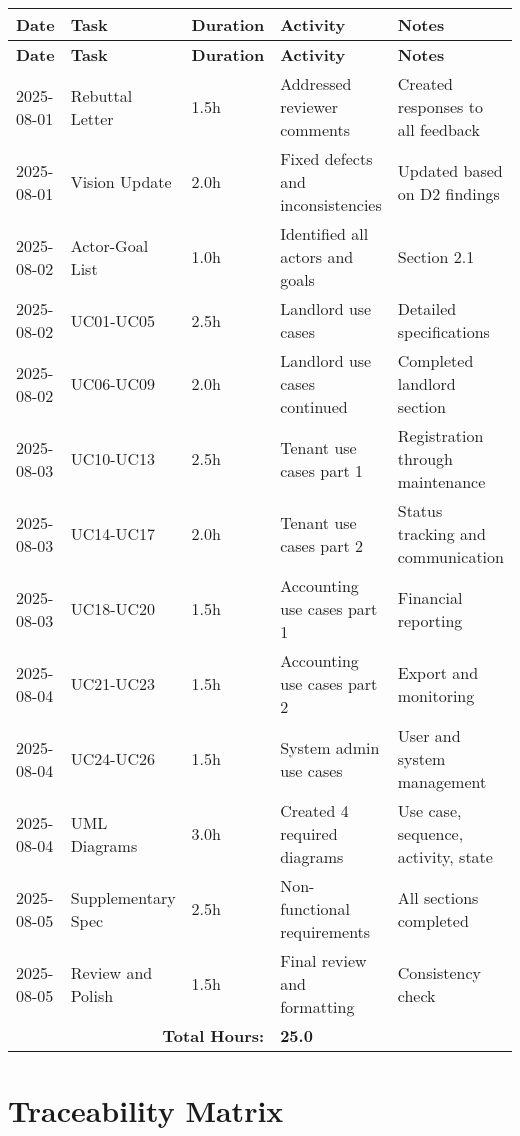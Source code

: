 \documentclass[12pt]{article}
\begin{document}
\begin{longtable}{|p{2.5cm}|p{3cm}|p{1.5cm}|p{4cm}|p{3cm}|}
\hline
\textbf{Date} & \textbf{Task} & \textbf{Duration} & \textbf{Activity} & \textbf{Notes} \\
\hline
\endfirsthead
\hline
\textbf{Date} & \textbf{Task} & \textbf{Duration} & \textbf{Activity} & \textbf{Notes} \\
\hline
\endhead

2025-08-01 & Rebuttal Letter & 1.5h & Addressed reviewer comments & Created responses to all feedback \\
\hline
2025-08-01 & Vision Update & 2.0h & Fixed defects and inconsistencies & Updated based on D2 findings \\
\hline
2025-08-02 & Actor-Goal List & 1.0h & Identified all actors and goals & Section 2.1 \\
\hline
2025-08-02 & UC01-UC05 & 2.5h & Landlord use cases & Detailed specifications \\
\hline
2025-08-02 & UC06-UC09 & 2.0h & Landlord use cases continued & Completed landlord section \\
\hline
2025-08-03 & UC10-UC13 & 2.5h & Tenant use cases part 1 & Registration through maintenance \\
\hline
2025-08-03 & UC14-UC17 & 2.0h & Tenant use cases part 2 & Status tracking and communication \\
\hline
2025-08-03 & UC18-UC20 & 1.5h & Accounting use cases part 1 & Financial reporting \\
\hline
2025-08-04 & UC21-UC23 & 1.5h & Accounting use cases part 2 & Export and monitoring \\
\hline
2025-08-04 & UC24-UC26 & 1.5h & System admin use cases & User and system management \\
\hline
2025-08-04 & UML Diagrams & 3.0h & Created 4 required diagrams & Use case, sequence, activity, state \\
\hline
2025-08-05 & Supplementary Spec & 2.5h & Non-functional requirements & All sections completed \\
\hline
2025-08-05 & Review and Polish & 1.5h & Final review and formatting & Consistency check \\
\hline
\multicolumn{3}{|r|}{\textbf{Total Hours:}} & \textbf{25.0} & \\
\hline
\end{longtable}

\section{Traceability Matrix}
\end{document}
